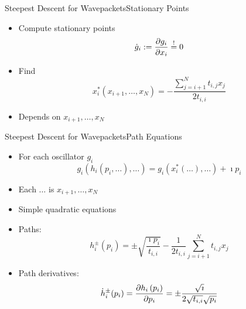 \documentclass{beamer}
\begin{document}
\begin{frame}{Steepest Descent for Wavepackets}{Stationary Points}
  \begin{itemize}
    \item Compute stationary points
    \begin{equation*}
      \dot{g}_i := \frac{\partial g_i}{\partial x_i} \stackrel{!}{=} 0
    \end{equation*}
    \item Find
    \begin{equation*}
      x_i^{*}\left(x_{i+1}, \ldots, x_N\right)
      = - \frac{ \sum_{j=i+1}^{N} t_{i,j} x_j }{ 2 t_{i,i} }
    \end{equation*}
    \item Depends on $x_{i+1}, \ldots, x_N$
  \end{itemize}
\end{frame}


\begin{frame}{Steepest Descent for Wavepackets}{Path Equations}
  \begin{itemize}
    \item For each oscillator $g_i$
    \begin{equation*}
      g_i\left(h_i\left(p_i,\ldots\right), \ldots\right)
      = g_i\left(x_i^{*}(\ldots), \ldots\right) + \imath p_i
    \end{equation*}
    \item Each $\ldots$ is $x_{i+1}, \ldots, x_{N}$
    \item Simple quadratic equations
    \item Paths:
    \begin{equation*}
      h_i^{\pm}(p_i)
      =
      \pm \sqrt{\frac{\imath p_i}{t_{i,i}}}
      -\frac{1}{2 t_{i,i}} \sum_{j=i+1}^{N} t_{i,j} x_j
    \end{equation*}
    \item Path derivatives:
    \begin{equation*}
      \dot{h}_i^{\pm}(p_i) = \frac{\partial h_i\left(p_i\right)}{\partial p_i}
      = \pm \frac{\sqrt{\imath}}{2 \sqrt{t_{i,i}}\sqrt{p_i}}
    \end{equation*}
  \end{itemize}
\end{frame}
\end{document}
